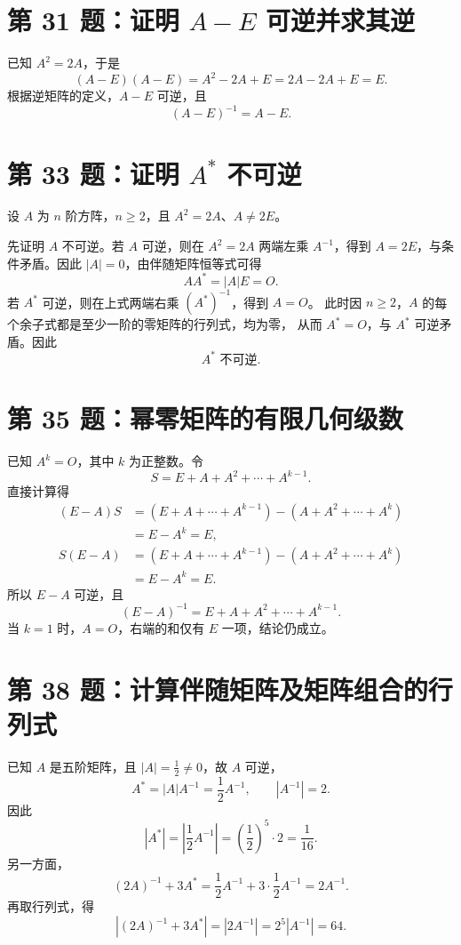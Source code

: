 \documentclass[11pt,a4paper,fontset=fandol]{ctexart}
\newcommand{\ans}[1]{\boxed{#1}}
\newcommand{\problem}[1]{\Needspace{9\baselineskip}\section*{#1}}
\begin{document}
\problem{第 31 题：证明 $A-E$ 可逆并求其逆}
已知 $A^2=2A$，于是
\[
(A-E)(A-E)=A^2-2A+E=2A-2A+E=E.
\]
根据逆矩阵的定义，$A-E$ 可逆，且
\[
\ans{(A-E)^{-1}=A-E}.
\]

\newpage
\problem{第 33 题：证明 $A^*$ 不可逆}
设 $A$ 为 $n$ 阶方阵，$n\ge2$，且 $A^2=2A$、$A\ne2E$。

先证明 $A$ 不可逆。若 $A$ 可逆，则在 $A^2=2A$ 两端左乘 $A^{-1}$，得到
$A=2E$，与条件矛盾。因此 $|A|=0$，由伴随矩阵恒等式可得
\[
AA^*=|A|E=O.
\]
若 $A^*$ 可逆，则在上式两端右乘 $(A^*)^{-1}$，得到 $A=O$。
此时因 $n\ge2$，$A$ 的每个余子式都是至少一阶的零矩阵的行列式，均为零，
从而 $A^*=O$，与 $A^*$ 可逆矛盾。因此
\[
\ans{A^*\text{ 不可逆}}.
\]

\problem{第 35 题：幂零矩阵的有限几何级数}
已知 $A^k=O$，其中 $k$ 为正整数。令
\[
S=E+A+A^2+\cdots+A^{k-1}.
\]
直接计算得
\begin{align*}
(E-A)S
&=(E+A+\cdots+A^{k-1})-(A+A^2+\cdots+A^k)\\
&=E-A^k=E,\\
S(E-A)
&=(E+A+\cdots+A^{k-1})-(A+A^2+\cdots+A^k)\\
&=E-A^k=E.
\end{align*}
所以 $E-A$ 可逆，且
\[
\ans{(E-A)^{-1}=E+A+A^2+\cdots+A^{k-1}}.
\]
当 $k=1$ 时，$A=O$，右端的和仅有 $E$ 一项，结论仍成立。

\problem{第 38 题：计算伴随矩阵及矩阵组合的行列式}
已知 $A$ 是五阶矩阵，且 $|A|=\frac12\ne0$，故 $A$ 可逆，
\[
A^*=|A|A^{-1}=\frac12A^{-1},\qquad |A^{-1}|=2.
\]
因此
\[
\ans{|A^*|=\left|\frac12A^{-1}\right|
=\left(\frac12\right)^5\cdot2=\frac1{16}}.
\]
另一方面，
\[
(2A)^{-1}+3A^*
=\frac12A^{-1}+3\cdot\frac12A^{-1}
=2A^{-1}.
\]
再取行列式，得
\[
\ans{\left|(2A)^{-1}+3A^*\right|
=|2A^{-1}|=2^5|A^{-1}|=64}.
\]
\end{document}
